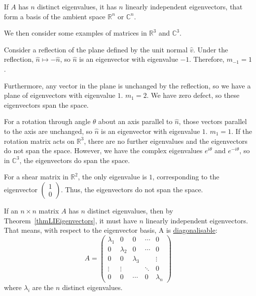 \documentclass[../Main.tex]{subfiles}
\begin{document}
\begin{corollary}
    If $A$ has $n$ distinct eigenvalues, it has $n$ linearly independent eigenvectors, that form a basis of the ambient space $\mathbb{R}^n$ or $\mathbb{C}^n$.
\end{corollary}
We then consider some examples of matrices in $\mathbb{R}^3$ and $\mathbb{C}^3$.
\begin{example}
    Consider a reflection of the plane defined by the unit normal $\hat{v}$. Under the reflection, $\hat{n}\mapsto -\hat{n}$, so $\hat{n}$ is an eigenvector with eigenvalue $-1$. Therefore, $m_{-1}=1$.\par
    Furthermore, any vector in the plane is unchanged by the reflection, so we have a plane of eigenvectors with eigenvalue $1$. $m_1 = 2$. We have zero defect, so these eigenvectors span the space.
\end{example}
\begin{example}
    For a rotation through angle $\theta$ about an axis parallel to $\hat{n}$, those vectors parallel to the axis are unchanged, so $\hat{n}$ is an eigenvector with eigenvalue $1$. $m_1 = 1$. If the rotation matrix acts on $\mathbb{R}^3$, there are no further eigenvalues and the eigenvectors do not span the space. However, we have the complex eigenvalues $e^{i\theta}$ and $e^{-i\theta}$, so in $\mathbb{C}^3$, the eigenvectors do span the space.
\end{example}
\begin{example}
    For a shear matrix in $\mathbb{R}^2$, the only eigenvalue is $1$, corresponding to the eigenvector $\begin{pmatrix}1 \\ 0\end{pmatrix}$. Thus, the eigenvectors do not span the space.
\end{example}
If an $n\times n$ matrix $A$ has $n$ distinct eigenvalues, then by Theorem~\ref{thmLIEigenvectors}, it must have $n$ linearly independent eigenvectors. That means, with respect to the eigenvector basis, A is \underline{diagonalisable}:
\begin{equation*}
    A =
    \begin{pmatrix}
        \lambda_1 & 0 & 0 & \cdots & 0 \\
        0 & \lambda_2 & 0 & \cdots & 0 \\
        0 & 0 & \lambda_3 & & \vdots \\
        \vdots & \vdots & & \ddots & 0 \\
        0 & 0 & \cdots & 0 & \lambda_n
    \end{pmatrix}
\end{equation*}
where $\lambda_i$ are the $n$ distinct eigenvalues.
\end{document}
